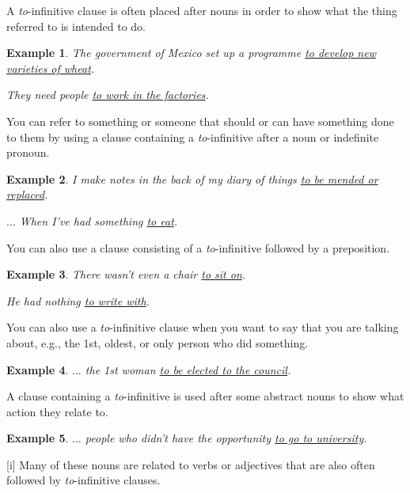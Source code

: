 \documentclass[oneside]{book}
\numberwithin{equation}{section}
\newtheorem{example}{Example}[section]
\begin{document}
%
\noindent{} A \textit{to}-infinitive clause is often placed after nouns in order to show what the thing referred to is intended to do.
\begin{example}
    The government of Mexico set up a programme \underline{to develop new varieties of wheat}.
    
    They need people \underline{to work in the factories}.
\end{example}
%
\noindent{} You can refer to something or someone that should or can have something done to them by using a clause containing a \textit{to}-infinitive after a noun or indefinite pronoun.
\begin{example}
    I make notes in the back of my diary of things \underline{to be mended or replaced}.
    
    $\ldots$ When I've had something \underline{to eat}.
\end{example}
You can also use a clause consisting of a \textit{to}-infinitive followed by a preposition.
\begin{example}
    There wasn't even a chair \underline{to sit on}.
    
    He had nothing \underline{to write with}.
\end{example}
%
\noindent{} You can also use a \textit{to}-infinitive clause when you want to say that you are talking about, e.g., the 1st, oldest, or only person who did something.
\begin{example}
    $\ldots$ the 1st woman \underline{to be elected to the council}.
\end{example}
%
\noindent{} A clause containing a \textit{to}-infinitive is used after some abstract nouns to show what action they relate to.
\begin{example}
    $\ldots$ people who didn't have the opportunity \underline{to go to university}.
\end{example}
%
\noindent{} [i] Many of these nouns are related to verbs or adjectives that are also often followed by \textit{to}-infinitive clauses.
\end{document}
